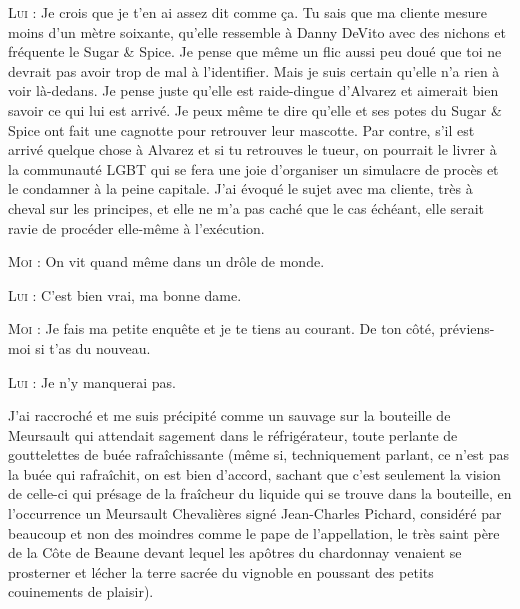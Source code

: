 \begin{dialogue}
\textsc{Lui} : Je crois que je t’en ai assez dit comme ça. Tu sais que ma cliente mesure moins d’un mètre soixante, qu’elle ressemble à Danny DeVito avec des nichons et fréquente le Sugar \& Spice. Je pense que même un flic aussi peu doué que toi ne devrait pas avoir trop de mal à l’identifier. Mais je suis certain qu’elle n’a rien à voir là-dedans. Je pense juste qu’elle est raide-dingue d’Alvarez et aimerait bien savoir ce qui lui est arrivé. Je peux même te dire qu’elle et ses potes du Sugar \& Spice ont fait une cagnotte pour retrouver leur mascotte. Par contre, s’il est arrivé quelque chose à Alvarez et si tu retrouves le tueur, on pourrait le livrer à la communauté LGBT qui se fera une joie d’organiser un simulacre de procès et le condamner à la peine capitale. J’ai évoqué le sujet avec ma cliente, très à cheval sur les principes, et elle ne m’a pas caché que le cas échéant, elle serait ravie de procéder elle-même à l’exécution.

\textsc{Moi} : On vit quand même dans un drôle de monde.

\textsc{Lui} : C’est bien vrai, ma bonne dame.

\textsc{Moi} : Je fais ma petite enquête et je te tiens au courant. De ton côté, préviens-moi si t’as du nouveau.

\textsc{Lui} : Je n’y manquerai pas.

\end{dialogue}

%
%
J’ai raccroché et me suis précipité comme un sauvage sur la bouteille de Meursault qui attendait sagement dans le réfrigérateur, toute perlante de gouttelettes de buée rafraîchissante (même si, techniquement parlant, ce n’est pas la buée qui rafraîchit, on est bien d’accord, sachant que c’est seulement la vision de celle-ci qui présage de la fraîcheur du liquide qui se trouve dans la bouteille, en l’occurrence un Meursault Chevalières signé Jean-Charles Pichard, considéré par beaucoup et non des moindres comme le pape de l’appellation, le très saint père de la Côte de Beaune devant lequel les apôtres du chardonnay venaient se prosterner et lécher la terre sacrée du vignoble en poussant des petits couinements de plaisir).

